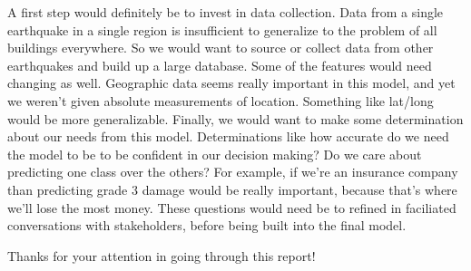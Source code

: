 \documentclass[11pt]{article}
\begin{document}
A first step would definitely be to invest in data collection. Data from
a single earthquake in a single region is insufficient to generalize to
the problem of all buildings everywhere. So we would want to source or
collect data from other earthquakes and build up a large database. Some
of the features would need changing as well. Geographic data seems
really important in this model, and yet we weren't given absolute
measurements of location. Something like lat/long would be more
generalizable. Finally, we would want to make some determination about
our needs from this model. Determinations like how accurate do we need
the model to be to be confident in our decision making? Do we care about
predicting one class over the others? For example, if we're an insurance
company than predicting grade 3 damage would be really important,
because that's where we'll lose the most money. These questions would
need be to refined in faciliated conversations with stakeholders, before
being built into the final model.

Thanks for your attention in going through this report!


    
    
    
    
\end{document}

